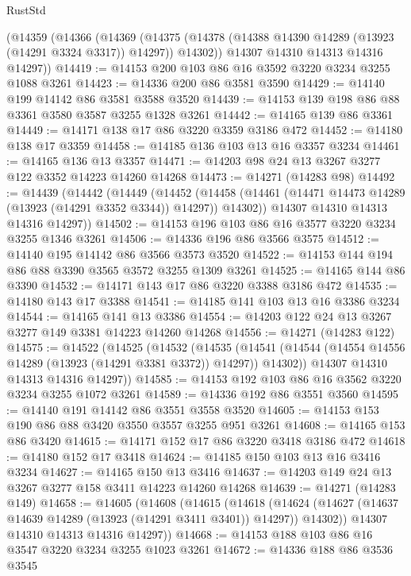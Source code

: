 \begin{lexlean}{RustStd}
\begin{coremodule}
    (@14359
      (@14366
        (@14369
          (@14375 (@14378 (@14388 @14390 @14289 (@13923 (@14291 @3324 @3317)) @14297)) @14302))
        @14307
        @14310
        @14313
        @14316
        @14297))
@14419 := @14153 @200 @103 @86 @16 @3592 @3220 @3234 @3255 @1088 @3261
@14423 := @14336 @200 @86 @3581 @3590
@14429 := @14140 @199 @14142 @86 @3581 @3588 @3520
@14439 := @14153 @139 @198 @86 @88 @3361 @3580 @3587 @3255 @1328 @3261
@14442 := @14165 @139 @86 @3361
@14449 := @14171 @138 @17 @86 @3220 @3359 @3186 @472
@14452 := @14180 @138 @17 @3359
@14458 := @14185 @136 @103 @13 @16 @3357 @3234
@14461 := @14165 @136 @13 @3357
@14471 := @14203 @98 @24 @13 @3267 @3277 @122 @3352 @14223 @14260 @14268
@14473 := @14271 (@14283 @98)
@14492 := @14439
    (@14442
      (@14449
        (@14452
          (@14458 (@14461 (@14471 @14473 @14289 (@13923 (@14291 @3352 @3344)) @14297)) @14302))
        @14307
        @14310
        @14313
        @14316
        @14297))
@14502 := @14153 @196 @103 @86 @16 @3577 @3220 @3234 @3255 @1346 @3261
@14506 := @14336 @196 @86 @3566 @3575
@14512 := @14140 @195 @14142 @86 @3566 @3573 @3520
@14522 := @14153 @144 @194 @86 @88 @3390 @3565 @3572 @3255 @1309 @3261
@14525 := @14165 @144 @86 @3390
@14532 := @14171 @143 @17 @86 @3220 @3388 @3186 @472
@14535 := @14180 @143 @17 @3388
@14541 := @14185 @141 @103 @13 @16 @3386 @3234
@14544 := @14165 @141 @13 @3386
@14554 := @14203 @122 @24 @13 @3267 @3277 @149 @3381 @14223 @14260 @14268
@14556 := @14271 (@14283 @122)
@14575 := @14522
    (@14525
      (@14532
        (@14535
          (@14541 (@14544 (@14554 @14556 @14289 (@13923 (@14291 @3381 @3372)) @14297)) @14302))
        @14307
        @14310
        @14313
        @14316
        @14297))
@14585 := @14153 @192 @103 @86 @16 @3562 @3220 @3234 @3255 @1072 @3261
@14589 := @14336 @192 @86 @3551 @3560
@14595 := @14140 @191 @14142 @86 @3551 @3558 @3520
@14605 := @14153 @153 @190 @86 @88 @3420 @3550 @3557 @3255 @951 @3261
@14608 := @14165 @153 @86 @3420
@14615 := @14171 @152 @17 @86 @3220 @3418 @3186 @472
@14618 := @14180 @152 @17 @3418
@14624 := @14185 @150 @103 @13 @16 @3416 @3234
@14627 := @14165 @150 @13 @3416
@14637 := @14203 @149 @24 @13 @3267 @3277 @158 @3411 @14223 @14260 @14268
@14639 := @14271 (@14283 @149)
@14658 := @14605
    (@14608
      (@14615
        (@14618
          (@14624 (@14627 (@14637 @14639 @14289 (@13923 (@14291 @3411 @3401)) @14297)) @14302))
        @14307
        @14310
        @14313
        @14316
        @14297))
@14668 := @14153 @188 @103 @86 @16 @3547 @3220 @3234 @3255 @1023 @3261
@14672 := @14336 @188 @86 @3536 @3545

\end{coremodule}
\end{lexlean}
